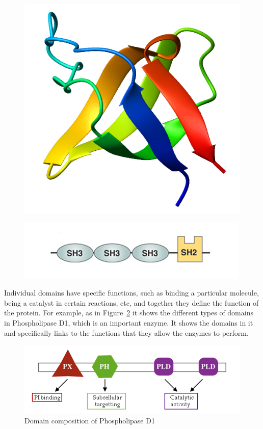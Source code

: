 \documentclass{article}
\begin{document}
\begin{figure}[h!]
\centering
\begin{minipage}{.5\textwidth}
  \centering
  \includegraphics[width=.65\linewidth]{SH3.png}
  \label{fig:SH3struct}
\end{minipage}%
\begin{minipage}{.5\textwidth}
  \centering
  \includegraphics[width=\linewidth]{multsh3.png}
  \label{fig:multSH3}
\end{minipage}
\end{figure}

Individual domains have specific functions, such as binding a particular molecule, being a catalyst in certain reactions, etc, and together they define the function of the protein. For example, as in Figure~\ref{fig:multidomain} it shows the different types of domains in Phospholipase D1, which is an important enzyme. It shows the domains in it and specifically links to the functions that they allow the enzymes to perform.

\begin{figure}[h!]
\centering
\includegraphics[width=.75\textwidth]{multidomain.png}
\caption{Domain composition of Phospholipase D1 \cite{EBI}}
\label{fig:multidomain}
\end{figure}
\end{document}
